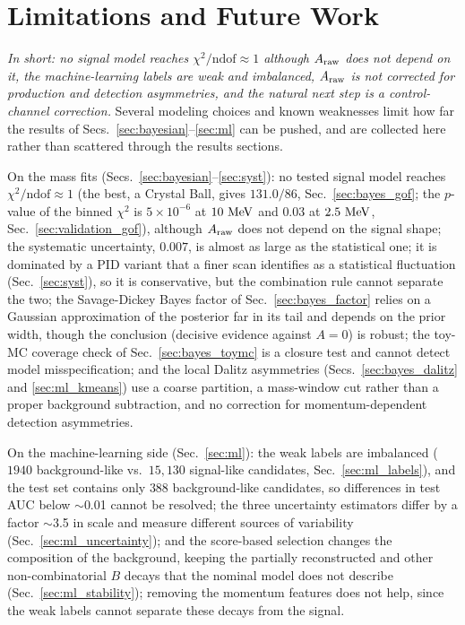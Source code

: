 \section{Limitations and Future Work}
\label{sec:limitations}
\emph{In short: no signal model reaches $\chi^2/\mathrm{ndof}\approx1$ although $A_{\mathrm{raw}}$ does not depend on it, the machine-learning labels are weak and imbalanced, $A_{\mathrm{raw}}$ is not corrected for production and detection asymmetries, and the natural next step is a control-channel correction.}
Several modeling choices and known weaknesses limit how far the results of Secs.~\ref{sec:bayesian}--\ref{sec:ml} can be pushed, and are collected here rather than scattered through the results sections.

On the mass fits (Secs.~\ref{sec:bayesian}--\ref{sec:syst}): no tested signal model reaches $\chi^2/\mathrm{ndof}\approx1$ (the best, a Crystal Ball, gives $131.0/86$, Sec.~\ref{sec:bayes_gof}; the $p$-value of the binned $\chi^2$ is $5\times10^{-6}$ at $10\,\,\text{Me\hspace{-.08em}V}$ and $0.03$ at $2.5\,\,\text{Me\hspace{-.08em}V}$, Sec.~\ref{sec:validation_gof}), although $A_{\mathrm{raw}}$ does not depend on the signal shape; the systematic uncertainty, $0.007$, is almost as large as the statistical one; it is dominated by a PID variant that a finer scan identifies as a statistical fluctuation (Sec.~\ref{sec:syst}), so it is conservative, but the combination rule cannot separate the two; the Savage-Dickey Bayes factor of Sec.~\ref{sec:bayes_factor} relies on a Gaussian approximation of the posterior far in its tail and depends on the prior width, though the conclusion (decisive evidence against $A=0$) is robust; the toy-MC coverage check of Sec.~\ref{sec:bayes_toymc} is a closure test and cannot detect model misspecification; and the local Dalitz asymmetries (Secs.~\ref{sec:bayes_dalitz} and \ref{sec:ml_kmeans}) use a coarse partition, a mass-window cut rather than a proper background subtraction, and no correction for momentum-dependent detection asymmetries.

On the machine-learning side (Sec.~\ref{sec:ml}): the weak labels are imbalanced ($1940$ background-like vs.\ $15{,}130$ signal-like candidates, Sec.~\ref{sec:ml_labels}), and the test set contains only $388$ background-like candidates, so differences in test AUC below $\sim$0.01 cannot be resolved; the three uncertainty estimators differ by a factor $\sim$3.5 in scale and measure different sources of variability (Sec.~\ref{sec:ml_uncertainty}); and the score-based selection changes the composition of the background, keeping the partially reconstructed and other non-combinatorial $B$ decays that the nominal model does not describe (Sec.~\ref{sec:ml_stability}); removing the momentum features does not help, since the weak labels cannot separate these decays from the signal.

